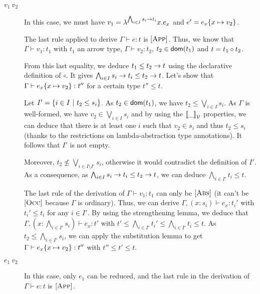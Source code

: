 \documentclass[a4paper]{article}
\theoremstyle{definition}
\begin{document}
        \begin{description}
          \item[$v_1\ v_2$] In this case, we must have $v_1=\lambda^{\bigwedge_{i\in I} s_i\to t_i}x.e_x$ and $e'=e_x\{x \mapsto v_2\}$.
    
          The last rule applied to derive $\Gamma \vdash e:t$ is $[\textsc{App}]$.
          Thus, we know that $\Gamma \vdash v_1 : t_1$ with $t_1$ an arrow type, $\Gamma \vdash v_2 : t_2$, $t_2 \in \textsf{dom}(t_1)$ and $t=t_1\circ t_2$.
    
          From this last equality, we deduce $t_1 \leq t_2\to t$ using the declarative definition of $\circ$.
          It gives $\bigwedge_{i\in I} s_i\to t_i \leq t_2\to t$.
          Let's show that $\Gamma \vdash e_x\{x \mapsto v_2\}:t''$ for a certain type $t''\leq t$.
    
          Let $I'=\{i\in I~|~ t_2 \leq s_i\}$. As $t_2 \in \textsf{dom}(t_1)$, we have $t_2 \leq \bigvee_{i\in I} s_i$.
          As $\Gamma$ is well-formed, we have $v_2 \in \bigvee_{i\in I} s_i$ and by using the ${\llbracket \_ \rrbracket}_{\mathcal{V}}$ properties,
          we can deduce that there is at least one $i$ such that $v_2 \in s_i$ and thus $t_2 \leq s_i$ (thanks to the restrictions on lambda-abstraction type annotations).
          It follows that $I'$ is not empty.
    
          Moreover, $t_2 \not\leq \bigvee_{i\in I\setminus I'} s_i$, otherwise it would contradict the definition of $I'$.
          As a consequence, as $\bigwedge_{i\in I} s_i\to t_i \leq t_2\to t$,
          we can deduce $\bigwedge_{i \in I'}t_i \leq t$.
    
          The last rule of the derivation of $\Gamma \vdash v_1 : t_1$ can only be $[\textsc{Abs}]$ (it can't be $[\textsc{Occ}]$ because $\Gamma$ is ordinary).
          Thus, we can derive $\Gamma,(x:s_i) \vdash e_x : t_i'$ with $t_i' \leq t_i$ for any $i\in I'$. By using the strengthening lemma, we deduce that
          $\Gamma, (x:\bigwedge_{i\in I'} s_i) \vdash e_x:t'$ with $t'\leq \bigwedge_{i\in I'} t_i' \leq \bigwedge_{i\in I'} t_i \leq t$.
          As $t_2 \leq \bigwedge_{i\in I'} s_i$, we can apply the substitution lemma to get $\Gamma \vdash e_x\{x \mapsto v_2\}:t''$ with $t'' \leq t' \leq t$.
    
          \item[$e_1\ v_2$] In this case, only $e_1$ can be reduced, and the last rule in the derivation of $\Gamma \vdash e:t$ is $[\textsc{App}]$.
    

\end{description}
\end{document}
